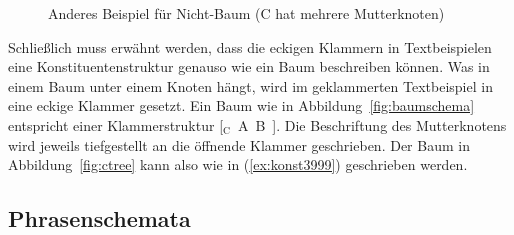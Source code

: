\begin{figure}[!htbp]
  \centering
  \caption[Anderes Beispiel für Nicht-Baum]{Anderes Beispiel für Nicht-Baum (C hat mehrere Mutterknoten)}
  \label{fig:notree2}
\end{figure}

Schließlich muss erwähnt werden, dass die eckigen Klammern in Textbeispielen eine Konstituentenstruktur genauso wie ein Baum beschreiben können.
Was in einem Baum unter einem Knoten hängt, wird im geklammerten Textbeispiel in eine eckige Klammer gesetzt.
Ein Baum wie in Abbildung~\ref{fig:baumschema} entspricht einer Klammerstruktur [$_\mathrm{C}$~A~B~].
Die Beschriftung des Mutterknotens wird jeweils tiefgestellt an die öffnende Klammer geschrieben.
Der Baum in Abbildung~\ref{fig:ctree} kann also wie in (\ref{ex:konst3999}) geschrieben werden.

\begin{exe}
  \ex{\label{ex:konst3999} [$_\textrm{C}$~A~[$_\textrm{B}$~D~E~F~]~]}
\end{exe}

\subsection{Phrasenschemata}

\label{sec:topologische}

